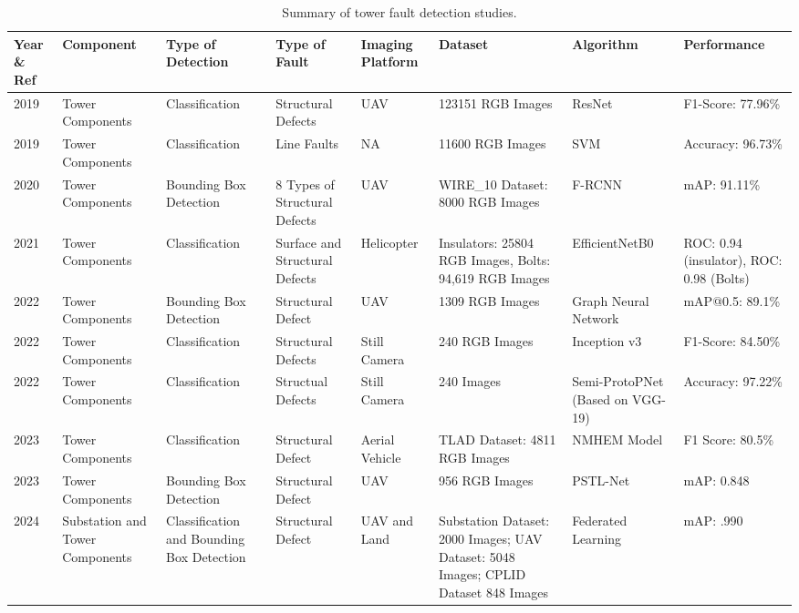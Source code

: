 \begin{table*}[htb]
\scriptsize
\caption{Summary of tower fault detection studies.}
\label{tab:tower_faults}
\begin{tabular}{P{.05} P{.1} P{.1} P{.1} P{.1} P{.15} P{.1} P{.1}}   

\hline  
Year \& Ref & Component & Type of Detection & Type of Fault & Imaging Platform & Dataset & Algorithm & Performance \\ 
\hline 

2019 \cite{nguyen_intelligent_2019} & Tower Components & Classification & Structural Defects & UAV & 123151 RGB Images & ResNet & F1-Score: 77.96\% \\

2019 \cite{wang_image_2019} & Tower Components & Classification & Line Faults & NA & 11600 RGB Images & SVM & Accuracy: 96.73\% \\

2020 \cite{liang_detection_2020} & Tower Components & Bounding Box Detection & 8 Types of Structural Defects & UAV & WIRE\_10 Dataset: 8000 RGB Images & F-RCNN & mAP: 91.11\% \\

2021 \cite{odo_aerial_2021} & Tower Components & Classification & Surface and Structural Defects & Helicopter & Insulators: 25804 RGB Images, Bolts: 94,619 RGB Images & EfficientNetB0 & ROC: 0.94 (insulator), ROC: 0.98 (Bolts) \\

2022 \cite{liu2022component} & Tower Components & Bounding Box Detection & Structural Defect & UAV & 1309 RGB Images & Graph Neural Network & mAP@0.5: 89.1\% \\

2022 \cite{stefenon_classification_2022} & Tower Components & Classification & Structural Defects & Still Camera & 240 RGB Images & Inception v3 & F1-Score: 84.50\% \\

2022 \cite{stefenon_semi_protopnet_2022} & Tower Components & Classification & Structual Defects & Still Camera & 240 Images & Semi-ProtoPNet (Based on VGG-19) & Accuracy: 97.22\% \\

2023 \cite{liu2023fault} & Tower Components & Classification & Structural Defect & Aerial Vehicle & TLAD Dataset: 4811 RGB Images & NMHEM Model & F1 Score: 80.5\% \\

2023 \cite{yi2023pstl} & Tower Components & Bounding Box Detection & Structural Defect & UAV & 956 RGB Images & PSTL-Net & mAP: 0.848 \\

2024 \cite{zhong2024visual} & Substation and Tower Components & Classification and Bounding Box Detection & Structural Defect & UAV and Land & Substation Dataset: 2000 Images; UAV Dataset: 5048 Images; CPLID Dataset 848 Images & Federated Learning & mAP: .990 \\
\hline

\end{tabular}
\end{table*}

